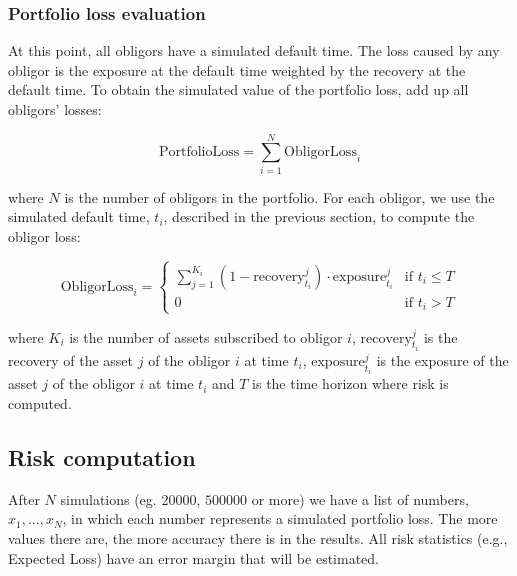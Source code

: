 \documentclass[a4paper,12pt,final]{article}
\begin{document}
\subsubsection{Portfolio loss evaluation}
\label{sec:portfolioloss}
At this point, all obligors have a simulated default time. The loss
caused by any obligor is the exposure at the default time weighted by 
the recovery at the default time. To obtain the simulated value of the 
portfolio loss, add up all obligors' losses:

\begin{displaymath}
\mathrm{PortfolioLoss} = \sum_{i=1}^N \mathrm{ObligorLoss}_i
\end{displaymath}

where $N$ is the number of obligors in the portfolio. For each obligor, we 
use the simulated default time, $t_i$, described in the previous section, to 
compute the obligor loss:

\begin{displaymath}
\mathrm{ObligorLoss}_{i} = \left\{
\begin{array}{ll}
\sum_{j=1}^{K_i} (1 - \mathrm{recovery}_{t_i}^j) \cdot \mathrm{exposure}_{t_i}^j & \textrm{if  } t_i \le T \\
0 & \textrm{if  } t_i > T
\end{array}
\right.
\end{displaymath}

where $K_i$ is the number of assets subscribed to obligor $i$, 
$\mathrm{recovery}_{t_i}^j$ is the recovery of the asset $j$ of the obligor $i$ at time $t_i$,
$\mathrm{exposure}_{t_i}^j$ is the exposure of the asset $j$ of the obligor $i$ at time $t_i$
and $T$ is the time horizon where risk is computed.

\subsection{Risk computation}
After $N$ simulations (eg. $20000$, $500000$ or more) we have a list
of numbers, ${x_1, ..., x_N}$, in which each number represents a simulated portfolio 
loss. The more values there are, the more accuracy there is in the results. All risk 
statistics (e.g., Expected Loss) have an error margin that will be estimated.
\newline
\end{document}
